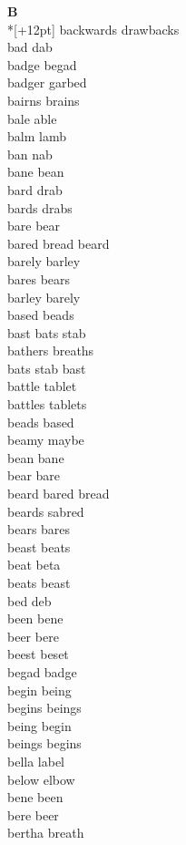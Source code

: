 \vspace{14pt}
\noindent\textbf{\Large B}\\*[+12pt]
backwards drawbacks\\
bad dab\\
badge begad\\
badger garbed\\
bairns brains\\
bale able\\
balm lamb\\
ban nab\\
bane bean\\
bard drab\\
bards drabs\\
bare bear\\
bared bread beard\\
barely barley\\
bares bears\\
barley barely\\
based beads\\
bast bats stab\\
bathers breaths\\
bats stab bast\\
battle tablet\\
battles tablets\\
beads based\\
beamy maybe\\
bean bane\\
bear bare\\
beard bared bread\\
beards sabred\\
bears bares\\
beast beats\\
beat beta\\
beats beast\\
bed deb\\
been bene\\
beer bere\\
beest beset\\
begad badge\\
begin being\\
begins beings\\
being begin\\
beings begins\\
bella label\\
below elbow\\
bene been\\
bere beer\\
bertha breath\\
